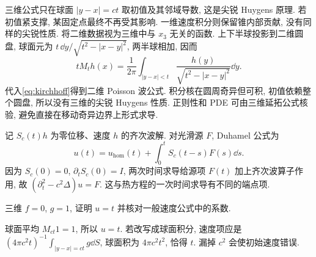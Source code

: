 三维公式只在球面 $|y-x|=ct$ 取初值及其邻域导数, 这是尖锐 Huygens 原理. 若初值紧支撑, 某固定点最终不再受其影响. 一维速度积分则保留锥内部贡献, 没有同样的尖锐性质.
将二维数据视为三维中与 $x_3$ 无关的函数. 上下半球投影到二维圆盘, 球面元为 $t\,\dd y/\sqrt{t^2-|x-y|^2}$, 两半球相加, 因而
\[
tM_th(x)=\frac1{2\pi}\int_{|y-x|<t}\frac{h(y)}{\sqrt{t^2-|x-y|^2}}\dd y.
\]
代入\eqref{eq:kirchhoff}得到二维 Poisson 波公式. 积分核在圆周奇异但可积, 初值依赖整个圆盘, 所以没有三维的尖锐 Huygens 性质. 正则性和 PDE 可由三维延拓公式核验, 避免直接在移动奇异边界上形式求导.

记 $S_c(t)h$ 为零位移、速度 $h$ 的齐次波解. 对光滑源 $F$, Duhamel 公式为
\[
u(t)=u_{\mathrm{hom}}(t)+\int_0^tS_c(t-s)F(s)\dd s.
\]
因为 $S_c(0)=0$, $\partial_tS_c(0)=I$, 两次时间求导给源项 $F(t)$ 加上齐次波算子作用, 故 $(\partial_t^2-c^2\Delta)u=F$. 这与热方程的一次时间求导有不同的端点项.
\begin{exercise}
三维 $f=0$, $g=1$, 证明 $u=t$ 并核对一般速度公式中的系数.
\end{exercise}
\begin{solution}
球面平均 $M_{ct}1=1$, 所以 $u=t$. 若改写成球面积分, 速度项应是 $(4\pi c^2t)^{-1}\int_{|y-x|=ct}g\dd S$, 球面积为 $4\pi c^2t^2$, 恰得 $t$. 漏掉 $c^2$ 会使初始速度错误.
\end{solution}

